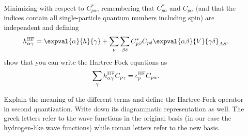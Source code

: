 Minimizing with respect to $C^*_{p\alpha}$, remembering that $C^*_{p\alpha}$ and $C_{p\alpha}$ (and that the indices contain all single-particle quantum numbers including spin) are independent and defining
\begin{equation*}
    h_{\alpha\gamma}^\HF = \expval{\alpha}{h}{\gamma} + \sum_{p} \sum_{\beta\delta} C^*_{p\beta} C_{p\delta} \expval{\alpha\beta}{V}{\gamma\delta}_{AS},
\end{equation*}
show that you can write the Hartree-Fock equations as
\begin{equation*}
    \sum_{\gamma} h_{\alpha\gamma}^{\mathrm{HF}} C_{p\gamma} = \epsilon_p^{\mathrm{HF}} C_{p\alpha}. \label{eq:newhf}
\end{equation*}

Explain the meaning of the different terms and define the Hartree-Fock operator in second quantization.
Write down its diagrammatic representation as well.
The greek letters refer to the wave functions in the original basis (in our case the hydrogen-like wave functions) while roman letters refer to the new basis.

